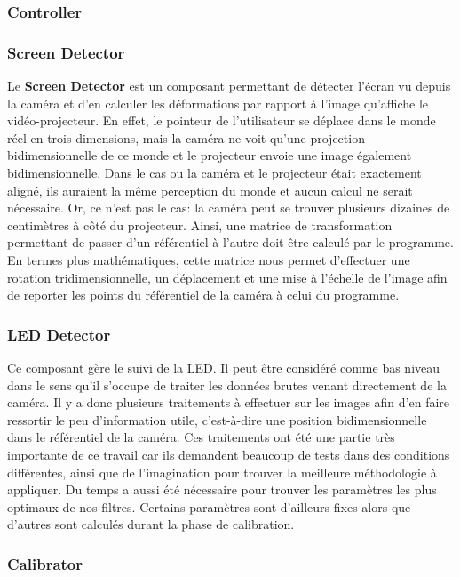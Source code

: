\documentclass[11pt,a4paper,oldfontcommands]{memoir}
\begin{document}
\subsubsection{Controller}

\subsubsection{Screen Detector}

Le \textbf{Screen Detector} est un composant permettant de détecter l'écran vu depuis la caméra et d'en calculer les déformations par rapport à l'image qu'affiche le vidéo-projecteur. En effet, le pointeur de l'utilisateur se déplace dans le monde réel en trois dimensions, mais la caméra ne voit qu'une projection bidimensionnelle de ce monde et le projecteur envoie une image également bidimensionnelle. Dans le cas ou la caméra et le projecteur était exactement aligné, ils auraient la même perception du monde et aucun calcul ne serait nécessaire. Or, ce n'est pas le cas: la caméra peut se trouver plusieurs dizaines de centimètres à côté du projecteur. Ainsi, une matrice de transformation permettant de passer d'un référentiel à l'autre doit être calculé par le programme. En termes plus mathématiques, cette matrice nous permet d'effectuer une rotation tridimensionnelle, un déplacement et une mise à l'échelle de l'image afin de reporter les points du référentiel de la caméra à celui du programme.

\subsubsection{LED Detector}

Ce composant gère le suivi de la LED. Il peut être considéré comme bas niveau dans le sens qu'il s'occupe de traiter les données brutes venant directement de la caméra. Il y a donc plusieurs traitements à effectuer sur les images afin d'en faire ressortir le peu d'information utile, c'est-à-dire une position bidimensionnelle dans le référentiel de la caméra. Ces traitements ont été une partie très importante de ce travail car ils demandent beaucoup de tests dans des conditions différentes, ainsi que de l'imagination pour trouver la meilleure méthodologie à appliquer. Du temps a aussi été nécessaire pour trouver les paramètres les plus optimaux de nos filtres. Certains paramètres sont d'ailleurs fixes alors que d'autres sont calculés durant la phase de calibration.

\subsubsection{Calibrator}
\end{document}
